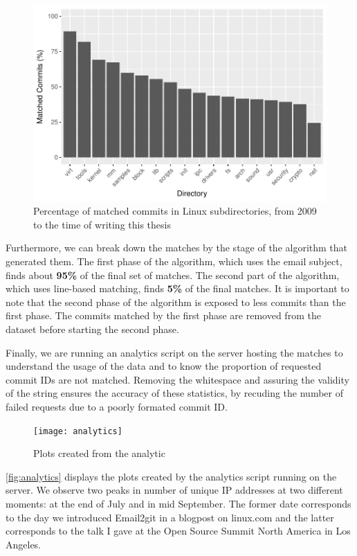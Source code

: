 \begin{figure}[htb]
\centering
\includegraphics[width=5in]{plots/matched_commits_dir}
\caption{Percentage of matched commits in Linux subdirectories, from 2009 to the time of writing this thesis}
\label{fig:matched_proportions}
\end{figure}

Furthermore, we can break down the matches by the stage of the algorithm that generated them. The first phase of the algorithm, which uses the email subject, finds about \textbf{95\%} of the final set of matches. The second part of the algorithm, which uses line-based matching, finds \textbf{5\%} of the final matches. It is important to note that the second phase of the algorithm is exposed to less commits than the first phase. The commits matched by the first phase are removed from the dataset before starting the second phase.



Finally, we are running an analytics script on the server hosting the matches to understand the usage of the data and to know the proportion of requested commit IDs are not matched. Removing the whitespace and assuring the validity of the string ensures the accuracy of these statistics, by recuding the number of failed requests due to a poorly formated commit ID.

\begin{figure}[htb]
\centering
\texttt{[image: analytics]}
\caption{Plots created from the analytic}
\label{fig:analytics}
\end{figure}

\autoref{fig:analytics} displays the plots created by the analytics script running on the server. We observe two peaks in number of unique IP addresses at two different moments: at the end of July and in mid September. The former date corresponds to the day we introduced Email2git in a blogpost on linux.com and the latter corresponds to the talk I gave at the Open Source Summit North America in Los Angeles. 

